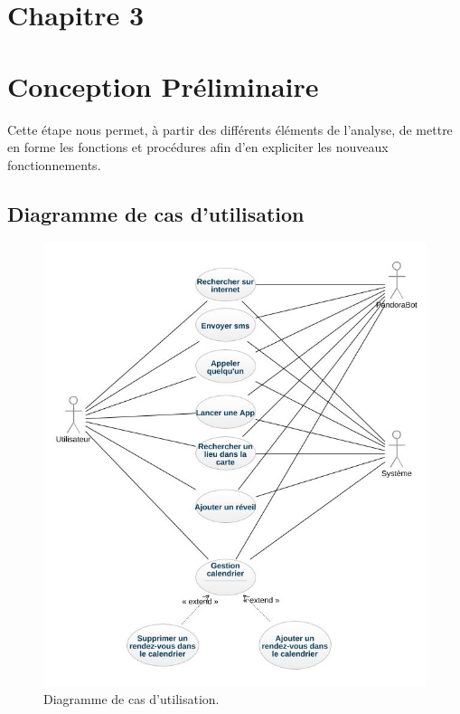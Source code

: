 \section*{Chapitre 3}
\section{Conception Préliminaire}
\indent Cette étape nous permet, à partir des différents éléments de l'analyse, de mettre en forme les fonctions et procédures afin d'en expliciter les nouveaux fonctionnements.

\subsection{Diagramme de cas d'utilisation}
\begin{figure}[ht]
\centering
\includegraphics[scale=0.5]{./diagrammes/UsecaseDiagram.jpeg}
\caption{Diagramme de cas d'utilisation.\label{fig2}}
\end{figure}

